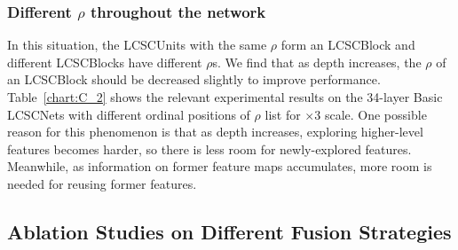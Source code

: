 \documentclass[journal]{IEEEtran}
\begin{document}
\begin{table}[htbp]
\centering
{}
\end{table}

\subsubsection{Different $\rho$ throughout the network}   

In this situation, the LCSCUnits with the same $\rho$ form an LCSCBlock and different LCSCBlocks have different $\rho$s. We find that as depth increases, the $\rho$ of an LCSCBlock should be decreased slightly to improve performance. Table~\ref{chart:C_2} shows the relevant experimental results on the 34-layer Basic LCSCNets with different ordinal positions of $\rho$ list for $\times$3 scale. One possible reason for this phenomenon is that as depth increases, exploring higher-level features becomes harder, so there is less room for newly-explored features. Meanwhile, as information on former feature maps accumulates, more room is needed for reusing former features.  


\subsection{Ablation Studies on Different Fusion Strategies} \label{s:s_5::D}
\end{document}

